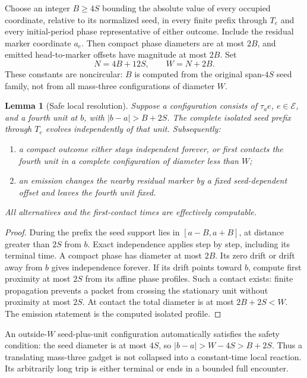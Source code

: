 \documentclass[11pt,letterpaper]{article}
\numberwithin{equation}{section}
\newtheorem{lemma}[theorem]{Lemma}
\theoremstyle{definition}
\theoremstyle{remark}
\begin{document}
Choose an integer $B\ge4S$ bounding the absolute value of every occupied
coordinate, relative to its normalized seed, in every finite prefix through
$T_e$ and every initial-period phase representative of either outcome.
Include the residual marker coordinate $a_e$. Then compact phase diameters
are at most $2B$, and emitted head-to-marker offsets have magnitude at most
$2B$. Set
\begin{equation}
             N=4B+12S,\qquad W=N+2B.            \label{smc:fm:eq:thresholds}
\end{equation}
These constants are noncircular: $B$ is computed from the original span-$4S$
seed family, not from all mass-three configurations of diameter $W$.

\begin{lemma}[Safe local resolution]\label{smc:fm:lem:safe}
Suppose a configuration consists of $\tau_a e$, $e\in\mathcal E$, and a
fourth unit at $b$, with $|b-a|>B+2S$. The complete isolated seed prefix through
$T_e$ evolves independently of that unit. Subsequently:
\begin{enumerate}
\item a compact outcome either stays independent forever, or first contacts the
fourth unit in a complete configuration of diameter less than $W$;
\item an emission changes the nearby residual marker by a fixed seed-dependent
offset and leaves the fourth unit fixed.
\end{enumerate}
All alternatives and the first-contact times are effectively computable.
\end{lemma}
\begin{proof}
During the prefix the seed support lies in $[a-B,a+B]$, at distance greater
than $2S$ from $b$. Exact independence applies step by step, including its
terminal time. A compact phase has diameter at most $2B$. Its zero drift or
drift away from $b$ gives independence forever. If its drift points toward
$b$, compute first proximity at most $2S$ from its affine phase profiles.
Such a contact exists: finite propagation prevents a packet from crossing the
stationary unit without proximity at most $2S$. At contact the total diameter
is at most $2B+2S<W$. The emission statement is the computed isolated profile.
\end{proof}

An outside-$W$ seed-plus-unit configuration automatically satisfies the safety
condition: the seed diameter is at most $4S$, so
$|b-a|>W-4S>B+2S$. Thus a translating mass-three gadget is not collapsed into
a constant-time local reaction. Its arbitrarily long trip is either terminal
or ends in a bounded full encounter.
\end{document}
